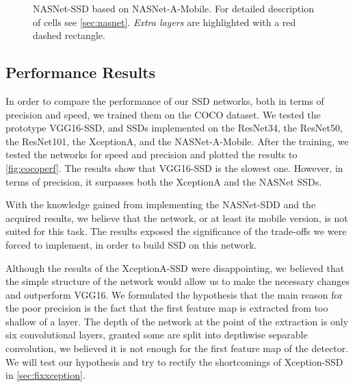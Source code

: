 

\begin{figure}
    \centering
    \nasnetSSD
    \caption[NASNet-SSD]%
    {NASNet-SSD based on NASNet-A-Mobile. For detailed description of cells see \cref{sec:nasnet}. \textit{Extra layers} are highlighted with a red dashed rectangle.}
    \label{fig:nasnetSSD}
\end{figure}

\subsection{Performance Results} In order to compare the performance of our SSD networks, both in terms of precision and speed, we trained them on the COCO dataset. We tested the prototype VGG16-SSD, and SSDs implemented on the ResNet34, the ResNet50, the ResNet101, the XceptionA, and the NASNet-A-Mobile. After the training, we tested the networks for speed and precision and plotted the results to \cref{fig:cocoperf}. The results show that VGG16-SSD is the slowest one. However, in terms of precision, it surpasses both the XceptionA and the NASNet SSDs.

With the knowledge gained from implementing the NASNet-SDD and the acquired results, we believe that the network, or at least its mobile version, is not suited for this task. The results exposed the significance of the trade-offs we were forced to implement, in order to build SSD on this network.

Although the results of the XceptionA-SSD were disappointing, we believed that the simple structure of the network would allow us to make the necessary changes and outperform VGG16. We formulated the hypothesis that the main reason for the poor precision is the fact that the first feature map is extracted from too shallow of a layer. The depth of the network at the point of the extraction is only six convolutional layers, granted some are split into depthwise separable convolution, we believed it is not enough for the first feature map of the detector. We will test our hypothesis and try to rectify the shortcomings of Xception-SSD in \cref{sec:fixxception}.


